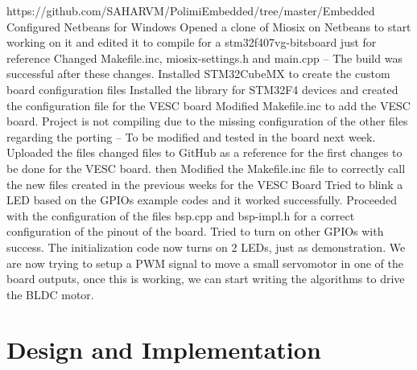 \documentclass[11pt]{article}
\begin{document}
  https://github.com/SAHARVM/PolimiEmbedded/tree/master/Embedded  Configured Netbeans for Windows  Opened a clone of Miosix on Netbeans to start working on it and edited it to compile for a stm32f407vg-bitsboard just for reference
  Changed Makefile.inc, miosix-settings.h and main.cpp – The build was successful after these changes.  Installed STM32CubeMX to create the custom board configuration files\newline
  Installed the library for STM32F4 devices and created the configuration file for the VESC board Modified Makefile.inc to add the VESC board. Project is not compiling due to the missing configuration of the other files regarding the porting – To be modified and tested in the board next week.  Uploaded the files changed files to GitHub as a reference for the first changes to be done for the VESC board.\newline
 then 
  Modified the Makefile.inc file to correctly call the new files created in the previous weeks for the VESC Board Tried to blink a LED based on the GPIOs example codes and it worked successfully.   Proceeded with the configuration of the files bsp.cpp and bsp-impl.h for a correct configuration of the pinout of the board.  Tried to turn on other GPIOs with success. The initialization code now turns on 2 LEDs, just as demonstration.  We are now trying to setup a PWM signal to move a small servomotor in one of the board outputs, once this is working, we can start writing the algorithms to drive the BLDC motor.\newline

\section{Design and Implementation}
\label{Design and Implementation}
\end{document}
